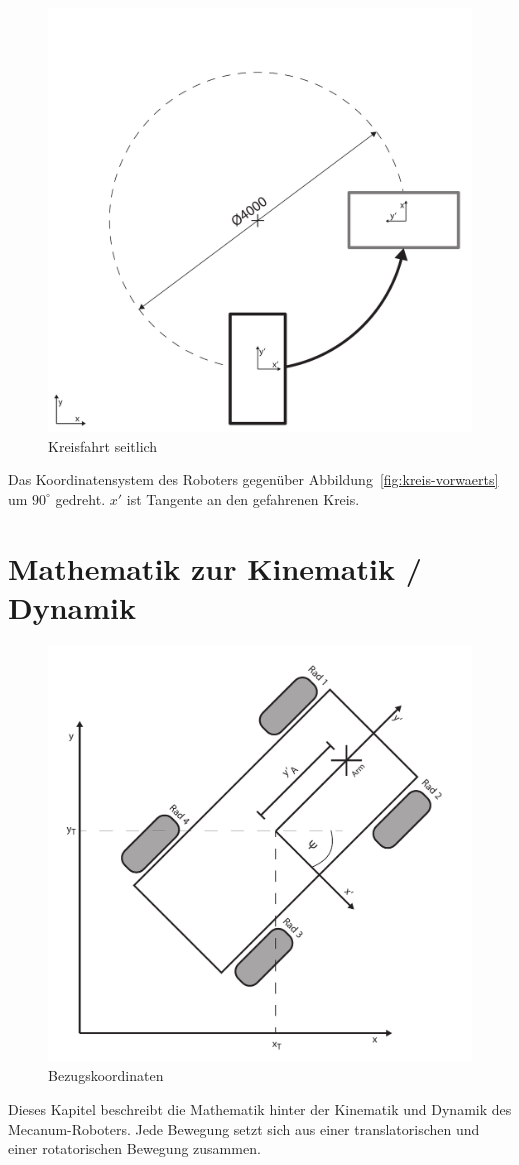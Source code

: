 \documentclass[a4paper]{article}
\begin{document}
\begin{figure}[H]
    \centering
    \includegraphics[width=.6\textwidth]{Abbildungen/Viertelkreis-seitwaerts}
    \caption{Kreisfahrt seitlich}
    \label{fig:kreis-seitwaerts}
\end{figure}
Das Koordinatensystem des Roboters gegenüber Abbildung~\ref{fig:kreis-vorwaerts} um $90^\circ$ gedreht. $x'$ ist Tangente an den gefahrenen Kreis.


\section{Mathematik zur Kinematik / Dynamik}
\begin{figure}
    \centering
    \includegraphics[width=.8\textwidth]{Abbildungen/Koordinaten}
    \caption{Bezugskoordinaten}
\end{figure}
Dieses Kapitel beschreibt die Mathematik hinter der Kinematik und Dynamik des Mecanum-Roboters.
Jede Bewegung setzt sich aus einer translatorischen und einer rotatorischen Bewegung zusammen.
\end{document}
